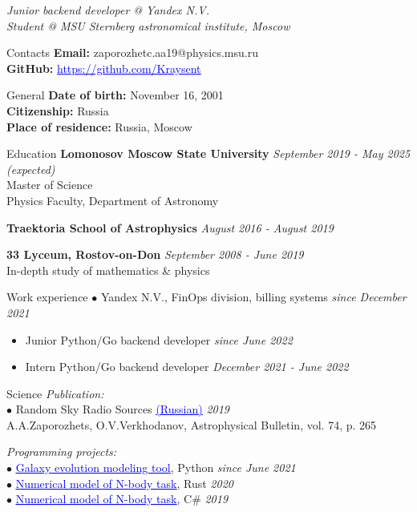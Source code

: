 \documentclass{resume} %
\newcommand{\link}[2]{\href{#1}{\textcolor{blue}{\underline{#2}}}}
\begin{document}
	\textit{Junior backend developer @ Yandex N.V.} \\
	\textit{Student @ MSU Sternberg astronomical institute, Moscow} 

	\begin{rSection}{Contacts}
		\textbf{Email: } zaporozhetc.aa19@physics.msu.ru
		\\ \textbf{GitHub: } \link{https://github.com/Kraysent}{https://github.com/Kraysent}
	\end{rSection}		

	\begin{rSection}{General}
		\textbf{Date of birth:} November 16, 2001
		\\ \textbf{Citizenship:} Russia
		\\ \textbf{Place of residence:} Russia, Moscow
	\end{rSection}

	\begin{rSection}{Education}
		\textbf{Lomonosov Moscow State University} \hfill \textit{September 2019 - May 2025 (expected)}
		\\ Master of Science
		\\ Physics Faculty, Department of Astronomy

		\textbf{Traektoria School of Astrophysics} \hfill \textit{August 2016 - August 2019}

		\textbf{33 Lyceum, Rostov-on-Don} \hfill \textit{September 2008 - June 2019}
		\\ In-depth study of mathematics \& physics
	\end{rSection}
	
	\begin{rSection}{Work experience}
		$\bullet$ Yandex N.V., FinOps division, billing systems \hfill \textit{since December 2021}
		\begin{itemize}
			\item Junior Python/Go backend developer \hfill \textit{since June 2022}
			\item Intern Python/Go backend developer \hfill \textit{December 2021 - June 2022}
		\end{itemize}
    \end{rSection}
    
    \begin{rSection}{Science}
		\textit{Publication:}
		\\ $\bullet$ Random Sky Radio Sources \link{http://www.sao.ru/Doc-k8/Science/Public/Bulletin/Vol74/N3/ASPB265.pdf}{(Russian)} \hfill \textit{2019}
		\\ A.A.Zaporozhets, O.V.Verkhodanov, Astrophysical Bulletin, vol. 74, p. 265

		\textit{Programming projects:}
		\\ $\bullet$ \link{https://github.com/Kraysent/OMTool}{Galaxy evolution modeling tool}, Python \hfill \textit{since June 2021}
		\\ $\bullet$ \link{https://github.com/Kraysent/XBodyModel}{Numerical model of N-body task}, Rust \hfill \textit{2020}
		\\ $\bullet$ \link{https://github.com/Kraysent/Gravity-Model}{Numerical model of N-body task}, C\# \hfill \textit{2019}
	\end{rSection}
	
\end{document}
